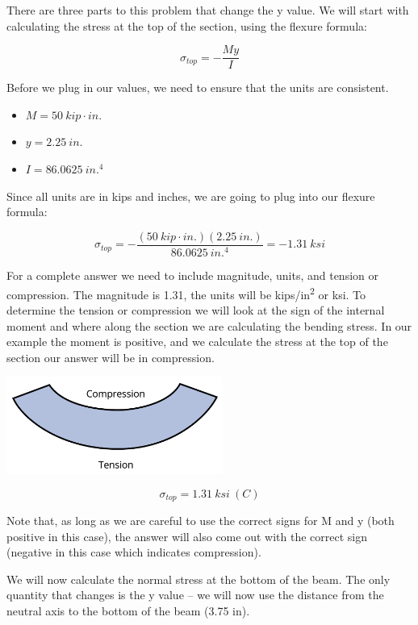 \documentclass[
  letterpaper,
  DIV=11,
  numbers=noendperiod]{scrreprt}
\theoremstyle{definition}
\theoremstyle{remark}
\begin{document}
\begin{tcolorbox}
\begin{tcolorbox}
There are three parts to this problem that change the y value. We will
start with calculating the stress at the top of the section, using the
flexure formula:

\[
\sigma_{t o p}=-\frac{M y}{I}
\]

Before we plug in our values, we need to ensure that the units are
consistent.

\begin{itemize}
\item
  \(M = 50{~kip}\cdot{in.}\)
\item
  \(y = 2.25{~in.}\)
\item
  \(I = 86.0625{~in.^4}\)
\end{itemize}

Since all units are in kips and inches, we are going to plug into our
flexure formula:

\[
\sigma_{top}=-\frac{(50{~kip}\cdot{in.})(2.25{~in.})}{86.0625{~in.}^4}=-1.31{~ksi}
\]

For a complete answer we need to include magnitude, units, and tension
or compression. The magnitude is 1.31, the units will be
kips/in\textsuperscript{2} or ksi. To determine the tension or
compression we will look at the sign of the internal moment and where
along the section we are calculating the bending stress. In our example
the moment is positive, and we calculate the stress at the top of the
section our answer will be in compression.

\begin{center}
\includegraphics[width=2.79167in,height=\textheight]{images/CH9 PNGs/Example 9.1 part 4.png}
\end{center}

\[
\sigma_{top}=1.31{~ksi}~(C)
\]

Note that, as long as we are careful to use the correct signs for M and
y (both positive in this case), the answer will also come out with the
correct sign (negative in this case which indicates compression).

We will now calculate the normal stress at the bottom of the beam. The
only quantity that changes is the y value -- we will now use the
distance from the neutral axis to the bottom of the beam (3.75 in).


\end{tcolorbox}
\end{tcolorbox}
\end{document}
